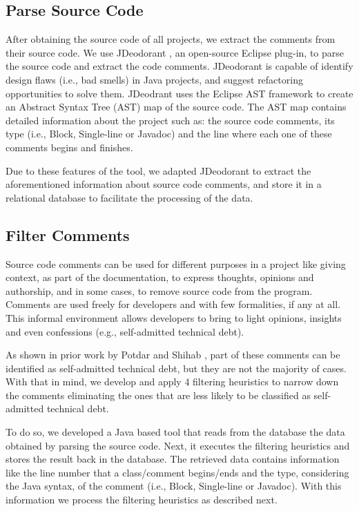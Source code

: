 \subsection{Parse Source Code} %
\label{sub:parse_source_code}

After obtaining the source code of all projects, we extract the comments from their source code. We use JDeodorant \cite{Tsantalis2008CSMR}, an open-source Eclipse plug-in, to parse the source code and extract the code comments. JDeodorant is capable of identify design flaws (i.e., bad smells) in Java projects, and suggest refactoring opportunities to solve them. JDeodrant uses the Eclipse AST framework to create an Abstract Syntax Tree (AST) map of the source code. The AST map contains detailed information about the project such as: the source code comments, its type (i.e., Block, Single-line or Javadoc) and the line where each one of these comments begins and finishes. 

Due to these features of the tool, we adapted JDeodorant to extract the aforementioned information about source code comments, and store it in a relational database to facilitate the processing of the data.

\subsection{Filter Comments} %
\label{sub:filter_comments}

Source code comments can be used for different purposes in a project like giving context, as part of the documentation, to express thoughts, opinions and authorship, and in some cases, to remove source code from the program. Comments are used freely for developers and with few formalities, if any at all. This informal environment allows developers to bring to light opinions, insights and even confessions (e.g., self-admitted technical debt). 

As shown in prior work by Potdar and Shihab \cite{Potdar2014ICSME}, part of these comments can be identified as self-admitted technical debt, but they are not the majority of cases. With that in mind, we develop and apply 4 filtering heuristics to narrow down the comments eliminating the ones that are less likely to be classified as self-admitted technical debt.

To do so, we developed a Java based tool that reads from the database the data obtained by parsing the source code. Next, it executes the filtering heuristics and stores the result back in the database. The retrieved data contains information like the line number that a class/comment begins/ends and the type, considering the Java syntax, of the comment (i.e., Block, Single-line or Javadoc). With this information we process the filtering heuristics as described next.

